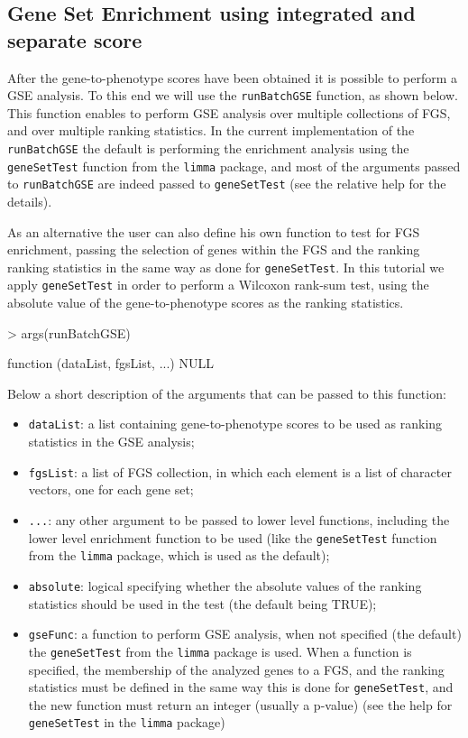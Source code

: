 \documentclass[11pt]{article}
\newcommand{\Rfunction}[1]{{\texttt{#1}}}
\newcommand{\Rpackage}[1]{{\texttt{#1}}}
\newcommand{\Rfunarg}[1]{{\texttt{#1}}}
\begin{document}
\subsection{Gene Set Enrichment using integrated and separate score}
After the gene-to-phenotype scores have been obtained it is possible to perform
a GSE analysis. To this end we will use the \Rfunction{runBatchGSE} function,
as shown below. This function enables to perform GSE analysis over multiple collections
of FGS, and over multiple ranking statistics.
In the current implementation of the \Rfunction{runBatchGSE} the default is
performing the enrichment analysis using the \Rfunction{geneSetTest} function 
from the \Rpackage{limma} package, and most of the arguments passed to 
\Rpackage{runBatchGSE} are indeed passed to \Rfunction{geneSetTest}
(see the relative help for the details).

As an alternative the user can also define his own function to test for FGS enrichment,
passing the selection of genes within the FGS and the ranking ranking statistics
in the same way as done for \Rfunction{geneSetTest}.
In this tutorial we apply \Rfunction{geneSetTest} in order to perform a
Wilcoxon rank-sum test, using the absolute value of the gene-to-phenotype scores 
as the ranking statistics.

\begin{Schunk}
\begin{Sinput}
> args(runBatchGSE)
\end{Sinput}
\begin{Soutput}
function (dataList, fgsList, ...) 
NULL
\end{Soutput}
\end{Schunk}

Below a short description of the arguments that can be passed to this function:
\begin{itemize}
 \item \Rfunarg{dataList}: a list containing gene-to-phenotype scores to be used
   as ranking statistics in the GSE analysis;
 \item \Rfunarg{fgsList}: a list of FGS collection, in which each element is a list of character vectors,
   one for each gene set;
 \item \Rfunarg{...}: any other argument to be passed to lower level functions, including 
   the lower level  enrichment function to be used (like the \Rfunction{geneSetTest} function
   from the \Rpackage{limma} package, which is used as the default);
 \item \Rfunarg{absolute}: logical specifying whether the absolute values of the ranking statistics 
   should be used in the test (the default being TRUE);
 \item \Rfunarg{gseFunc}: a function to perform GSE analysis, when not specified (the default) the
   \Rfunction{geneSetTest} from the \Rpackage{limma} package is used. When a function is specified,
   the membership of the analyzed genes to a FGS, and the ranking statistics must be defined in the
   same way this is done for \Rfunction{geneSetTest}, and the new function must
   return an integer (usually a p-value) (see the help for \Rfunction{geneSetTest}
   in the \Rpackage{limma} package)
 \end{itemize}
\end{document}
